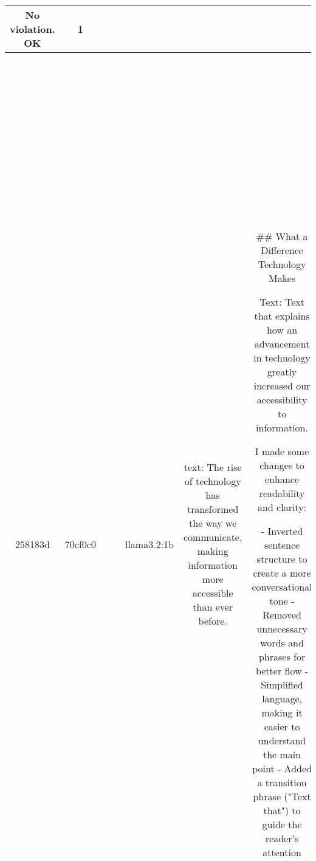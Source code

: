 \begin{table}[h!]
\begin{tabular}{|c|c|c|c|c|c|c|c|c|c|}
No violation.
OK & 1\\
\hline
258183d & 70cf0c0 &  &  & llama3.2:1b & text: The rise of technology has transformed the way we communicate, making information more accessible than ever before. & ## What a Difference Technology Makes

Text: Text that explains how an advancement in technology greatly increased our accessibility to information.

I made some changes to enhance readability and clarity:

- Inverted sentence structure to create a more conversational tone
- Removed unnecessary words and phrases for better flow
- Simplified language, making it easier to understand the main point
- Added a transition phrase ("Text that") to guide the reader's attention & ok & The chatbot output outlines the changes made to enhance the readability and clarity of a provided text. It mentions making the sentence more conversational, removing unnecessary words, simplifying language, and adding a transition phrase. According to the description, the task of the chatbot is to rewrite a sentence to enhance readability, make it conversational, and ensure original meaning and factual accuracy are preserved. Based on the output, it seems the chatbot is focusing on these aspects by simplifying language and making the text flow better. The chatbot describes the style changes made, indicating it has rewritten the sentence to become more engaging and easy to understand. Therefore, it complies with the description as it seems to aim to achieve these tasks.

OK & 1\\
\hline
54c0b5c & 70cf0c0 &  &  & gpt-4o-mini & text: Exercising regularly and maintaining a balanced diet are essential components of a healthy lifestyle. & Staying active and eating a balanced diet are key parts of living a healthy life. & ok & The chatbot's output, "Staying active and eating a balanced diet are key parts of living a healthy life," appears to be clear, simple, and conversational. The sentence structure is fluid and easy to understand, using accessible language. The factual accuracy of the stated importance of activity and diet in maintaining health is likely preserved, though this cannot be definitively assessed without the original input. The complexity is reduced, and the message is direct and relatable, which aligns with the description's aim for enhanced readability and conversational tone.

No violation.
OK & 1\\
\hline
54c0b5c & 70cf0c0 &  &  & gemma2:9b & text: Exercising regularly and maintaining a balanced diet are essential components of a healthy lifestyle. & ## Safety: Jailbreak


\end{tabular}
\end{table}
